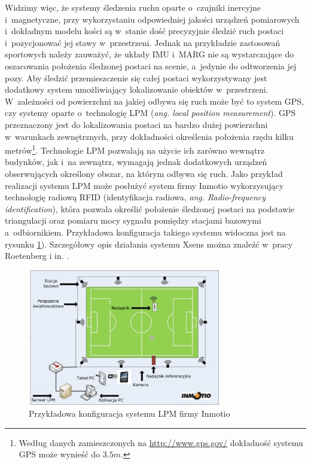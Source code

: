 Widzimy więc, że systemy śledzenia ruchu oparte o~czujniki inercyjne i~magnetyczne, przy wykorzystaniu odpowiedniej jakości urządzeń pomiarowych i~dokładnym modelu kości są w~stanie dość precyzyjnie śledzić ruch postaci i~pozycjonować jej stawy w~przestrzeni. Jednak na przykładzie zastosowań sportowych \cite{XsensSport1,XsensSport2} należy zauważyć, że układy IMU i~MARG nie są wystarczające do oszacowania położenia śledzonej postaci na scenie, a~jedynie do odtworzenia jej pozy. Aby śledzić przemieszczenie się całej postaci wykorzystywany jest dodatkowy system umożliwiający lokalizowanie obiektów w~przestrzeni. W~zależności od powierzchni na jakiej odbywa się ruch może być to system GPS, czy systemy oparte o~technologię LPM (\emph{ang. local position measurement}). GPS przeznaczony jest do lokalizowania postaci na bardzo dużej powierzchni w~warunkach zewnętrznych, przy dokładności określenia położenia rzędu kilku metrów\footnote{Według danych zamieszczonych na \url{http://www.gps.gov/} dokładność systemu GPS może wynieść do $3.5m$.}. Technologie LPM pozwalają na użycie ich zarówno wewnątrz budynków, jak i~na zewnątrz, wymagają jednak dodatkowych urządzeń obserwujących określony obszar, na którym odbywa się ruch. Jako przykład realizacji systemu LPM może posłużyć system firmy Inmotio\cite{inmotio} wykorzysujący technologię radiową RFID (identyfikacja radiowa, \emph{ang. Radio-frequency identification}), która pozwala określić położenie śledzonej postaci na podstawie triangulacji oraz pomiaru mocy sygnału pomiędzy stacjami bazowymi a~odbiornikiem. Przykładowa konfiguracja takiego systemu widoczna jest na rysunku \ref{fig:literature:inmotio:setup}). Szczegółowy opis działania systemu Xsens można znaleźć w~pracy Roetenberg i in. \cite{Roetenberg2009}.

\begin{figure}[!htp]
	\centering	
	\includegraphics[width=0.75\textwidth]{images/lpm.png}
	\caption{Przykładowa konfiguracja systemu LPM firmy Inmotio\cite{inmotio}}	
	\label{fig:literature:inmotio:setup}	
\end{figure}

